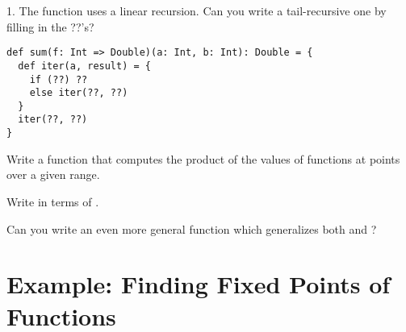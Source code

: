 \begin{exercise}
1. The  function uses a linear recursion. Can you write a
tail-recursive one by filling in the ??'s?

\begin{lstlisting}
def sum(f: Int => Double)(a: Int, b: Int): Double = {
  def iter(a, result) = {
    if (??) ??
    else iter(??, ??)
  }
  iter(??, ??)
}
\end{lstlisting}
\end{exercise}

\begin{exercise}
Write a function  that computes the product of the
values of functions at points over a given range.
\end{exercise}

\begin{exercise}
Write  in terms of .
\end{exercise}

\begin{exercise}
Can you write an even more general function which generalizes both
 and ?
\end{exercise}

\section{Example: Finding Fixed Points of Functions}

